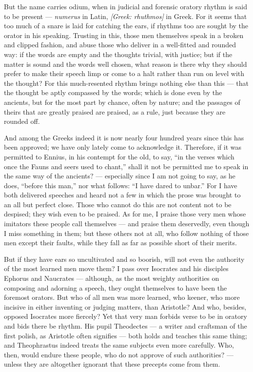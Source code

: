  But the name carries odium, when in judicial and forensic oratory rhythm is said to be present — \textit{numerus} in Latin, \textit{[Greek: rhuthmos]} in Greek. For it seems that too much of a snare is laid for catching the ears, if rhythms too are sought by the orator in his speaking. Trusting in this, those men themselves speak in a broken and clipped fashion, and abuse those who deliver in a well-fitted and rounded way: if the words are empty and the thoughts trivial, with justice; but if the matter is sound and the words well chosen, what reason is there why they should prefer to make their speech limp or come to a halt rather than run on level with the thought? For this much-resented rhythm brings nothing else than this — that the thought be aptly compassed by the words; which is done even by the ancients, but for the most part by chance, often by nature; and the passages of theirs that are greatly praised are praised, as a rule, just because they are rounded off.

 And among the Greeks indeed it is now nearly four hundred years since this has been approved; we have only lately come to acknowledge it. Therefore, if it was permitted to Ennius, in his contempt for the old, to say, ``in the verses which once the Fauns and seers used to chant,'' shall it not be permitted me to speak in the same way of the ancients? — especially since I am not going to say, as he does, ``before this man,'' nor what follows: ``I have dared to unbar.'' For I have both delivered speeches and heard not a few in which the prose was brought to an all but perfect close. Those who cannot do this are not content not to be despised; they wish even to be praised. As for me, I praise those very men whose imitators these people call themselves — and praise them deservedly, even though I miss something in them; but these others not at all, who follow nothing of those men except their faults, while they fall as far as possible short of their merits.

 But if they have ears so uncultivated and so boorish, will not even the authority of the most learned men move them? I pass over Isocrates and his disciples Ephorus and Naucrates — although, as the most weighty authorities on composing and adorning a speech, they ought themselves to have been the foremost orators. But who of all men was more learned, who keener, who more incisive in either inventing or judging matters, than Aristotle? And who, besides, opposed Isocrates more fiercely? Yet that very man forbids verse to be in oratory and bids there be rhythm. His pupil Theodectes — a writer and craftsman of the first polish, as Aristotle often signifies — both holds and teaches this same thing; and Theophrastus indeed treats the same subjects even more carefully. Who, then, would endure these people, who do not approve of such authorities? — unless they are altogether ignorant that these precepts come from them.

